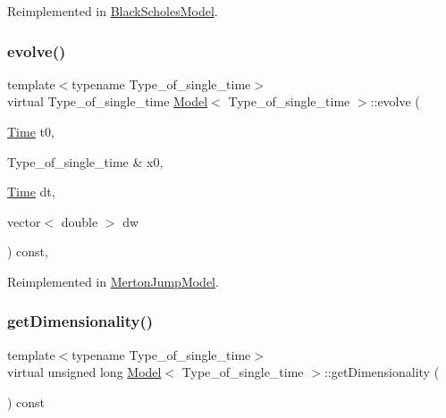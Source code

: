 Reimplemented in \hyperlink{class_black_scholes_model_a67c3ed604a6d057112ec7e7a1a3fb301}{Black\+Scholes\+Model}.

\hypertarget{class_model_a2bc277990d41a0abc4e2658f94107481}{}\label{class_model_a2bc277990d41a0abc4e2658f94107481} 
\subsubsection{\texorpdfstring{evolve()}{evolve()}\hspace{0.1cm}{\footnotesize\ttfamily [2/2]}}
{\footnotesize\ttfamily template$<$typename Type\+\_\+of\+\_\+single\+\_\+time$>$ \\
virtual Type\+\_\+of\+\_\+single\+\_\+time \hyperlink{class_model}{Model}$<$ Type\+\_\+of\+\_\+single\+\_\+time $>$\+::evolve (\begin{DoxyParamCaption}\item[{\hyperlink{_name_def_8h_ac2d3e0ba793497bcca555c7c2cf64ff3}{Time}}]{t0,  }\item[{Type\+\_\+of\+\_\+single\+\_\+time \&}]{x0,  }\item[{\hyperlink{_name_def_8h_ac2d3e0ba793497bcca555c7c2cf64ff3}{Time}}]{dt,  }\item[{vector$<$ double $>$}]{dw }\end{DoxyParamCaption}) const\hspace{0.3cm}{\ttfamily [inline]}, {\ttfamily [virtual]}}



Reimplemented in \hyperlink{class_merton_jump_model_a2d3491f75435d364f6102e72b8376d81}{Merton\+Jump\+Model}.

\hypertarget{class_model_a26832ec2df24d7941783d3cd6d500898}{}\label{class_model_a26832ec2df24d7941783d3cd6d500898} 
\subsubsection{\texorpdfstring{get\+Dimensionality()}{getDimensionality()}}
{\footnotesize\ttfamily template$<$typename Type\+\_\+of\+\_\+single\+\_\+time$>$ \\
virtual unsigned long \hyperlink{class_model}{Model}$<$ Type\+\_\+of\+\_\+single\+\_\+time $>$\+::get\+Dimensionality (\begin{DoxyParamCaption}{ }\end{DoxyParamCaption}) const\hspace{0.3cm}{\ttfamily [pure virtual]}}




